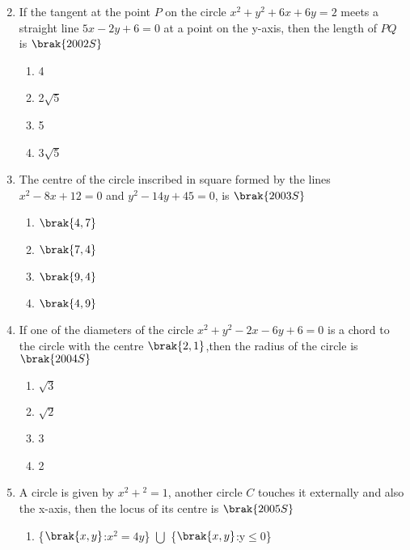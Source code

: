 \begin{enumerate}
\begin{multicols}{2}
     \end{multicols}
     \item If the tangent at the point $P$ on the circle $x^2+y^2+6x+6y=2$ meets a straight line $5x-2y+6=0$ at a point on the y-axis, then the length of $PQ$ is 
             \hfill$\brak{2002S}$
             \begin{multicols}{2}
         \begin{enumerate}
             \item 4
             \item 2$\sqrt5$
             \item 5
             \item 3$\sqrt5$
\end{enumerate}
\end{multicols}
     \item The centre of the circle inscribed in square formed by the lines $x^2-8x+12=0$ and $y^2-14y+45=0$, is
         \hfill$\brak{2003S}$
         \begin{multicols}{2}
     \begin{enumerate}
         \item $\brak{4,7}$
         \item $\brak{7,4}$
         \item $\brak{9,4}$
         \item $\brak{4,9}$
     \end{enumerate}
     \end{multicols}
     \item If one of the diameters of the circle $x^2+y^2-2x-6y+6=0$ is a chord to the circle with the centre $\brak{2,1}$,then the radius of the circle is 
         \hfill$\brak{2004S}$
         \begin{multicols}{2}
     \begin{enumerate}
         \item $\sqrt3$
         \item $\sqrt2$
         \item 3
         \item 2
     \end{enumerate}
     \end{multicols}
     \item A circle is given by $x^2+$$^2=1$, another circle $C$ touches it externally and also the x-axis, then the locus of its centre is
         \hfill$\brak{2005S}$
         \begin{multicols}{2}
     \begin{enumerate}
         \item \{$\brak{x,y}$:$x^2=4y$\} $\bigcup$ \{$\brak{x,y}$:y$\le$0\}

\end{enumerate}
\end{multicols}
\end{enumerate}
